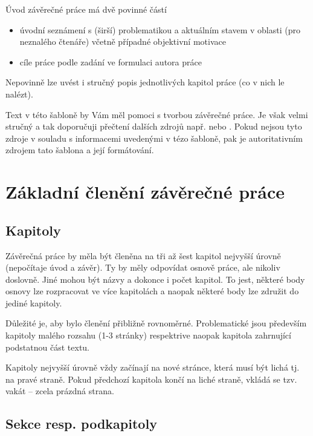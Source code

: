 \documentclass[male,czech,api_bc]{kitheses}
\begin{document}
\tableofcontents


Úvod závěrečné práce má dvě povinné částí

\begin{itemize}
\item úvodní seznámení s (širší) problematikou a aktuálním stavem v oblasti (pro neznalého čtenáře) včetně případné objektivní motivace 
\item cíle práce podle zadání ve formulaci autora práce
\end{itemize}

Nepovinně lze uvést i stručný popis jednotlivých kapitol práce (co v nich le nalézt).

Text v této šabloně by Vám měl pomoci s tvorbou závěrečné práce. Je však velmi stručný a tak doporučuji přečtení dalších zdrojů např. \cite{Katuscakc2008} nebo 
\cite{Ticha2009}. Pokud nejsou tyto zdroje v souladu s informacemi uvedenými v tézo šabloně, pak je autoritativním zdrojem tato šablona a její formátování.

\chapter{Základní členění závěrečné práce}

\section{Kapitoly}

Závěrečná práce by měla být členěna na tři až šest kapitol nejvyšší úrovně (nepočítaje úvod a závěr). Ty by měly odpovídat osnově práce, ale nikoliv doslovně. Jiné mohou být názvy a dokonce i počet kapitol. To jest, některé body osnovy lze rozpracovat ve více kapitolách a naopak některé body lze združit do jediné kapitoly.

Důležité je, aby bylo členění přibližně rovnoměrné. Problematické jsou především kapitoly malého rozsahu (1-3 stránky) respektrive naopak kapitola zahrnující podstatnou část textu.

Kapitoly nejvyšší úrovně vždy začínají na nové stránce, která musí být lichá tj. na pravé straně. Pokud předchozí kapitola končí na liché straně, vkládá se tzv. vakát -- zcela prázdná strana. 

\section{Sekce resp. podkapitoly}
\end{document}
